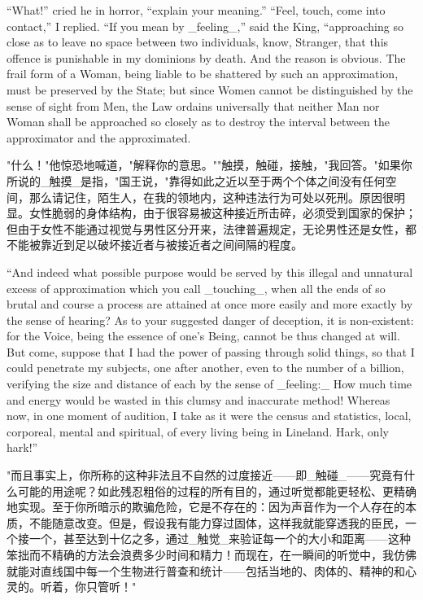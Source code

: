 \documentclass[12pt,UTF8]{ctexbook}
\begin{document}
``What!'' cried he in horror, ``explain your meaning.'' ``Feel, touch, come into contact,'' I replied. ``If you mean by \_feeling\_,'' said the King, ``approaching so close as to leave no space between two individuals, know, Stranger, that this offence is punishable in my dominions by death. And the reason is obvious. The frail form of a Woman, being liable to be shattered by such an approximation, must be preserved by the State; but since Women cannot be distinguished by the sense of sight from Men, the Law ordains universally that neither Man nor Woman shall be approached so closely as to destroy the interval between the approximator and the approximated.

"什么！"他惊恐地喊道，"解释你的意思。""触摸，触碰，接触，"我回答。"如果你所说的\_触摸\_是指，"国王说，"靠得如此之近以至于两个个体之间没有任何空间，那么请记住，陌生人，在我的领地内，这种违法行为可处以死刑。原因很明显。女性脆弱的身体结构，由于很容易被这种接近所击碎，必须受到国家的保护；但由于女性不能通过视觉与男性区分开来，法律普遍规定，无论男性还是女性，都不能被靠近到足以破坏接近者与被接近者之间间隔的程度。

``And indeed what possible purpose would be served by this illegal and unnatural excess of approximation which you call \_touching\_, when all the ends of so brutal and course a process are attained at once more easily and more exactly by the sense of hearing? As to your suggested danger of deception, it is non-existent: for the Voice, being the essence of one's Being, cannot be thus changed at will. But come, suppose that I had the power of passing through solid things, so that I could penetrate my subjects, one after another, even to the number of a billion, verifying the size and distance of each by the sense of \_feeling:\_ How much time and energy would be wasted in this clumsy and inaccurate method! Whereas now, in one moment of audition, I take as it were the census and statistics, local, corporeal, mental and spiritual, of every living being in Lineland. Hark, only hark!''

"而且事实上，你所称的这种非法且不自然的过度接近——即\_触碰\_——究竟有什么可能的用途呢？如此残忍粗俗的过程的所有目的，通过听觉都能更轻松、更精确地实现。至于你所暗示的欺骗危险，它是不存在的：因为声音作为一个人存在的本质，不能随意改变。但是，假设我有能力穿过固体，这样我就能穿透我的臣民，一个接一个，甚至达到十亿之多，通过\_触觉\_来验证每一个的大小和距离——这种笨拙而不精确的方法会浪费多少时间和精力！而现在，在一瞬间的听觉中，我仿佛就能对直线国中每一个生物进行普查和统计——包括当地的、肉体的、精神的和心灵的。听着，你只管听！"
\end{document}
